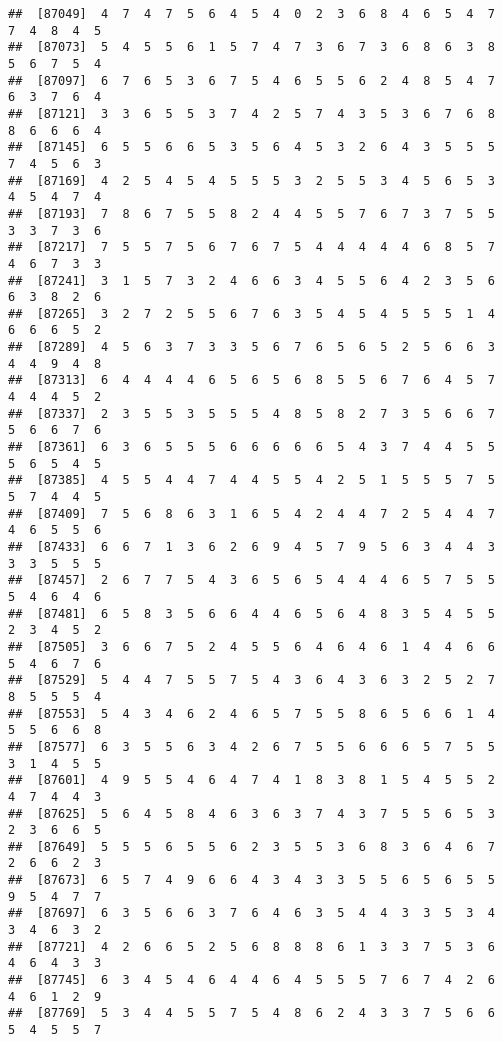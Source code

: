 \documentclass[
]{book}
\begin{document}
\begin{verbatim}
##  [87049]  4  7  4  7  5  6  4  5  4  0  2  3  6  8  4  6  5  4  7  7  4  8  4  5
##  [87073]  5  4  5  5  6  1  5  7  4  7  3  6  7  3  6  8  6  3  8  5  6  7  5  4
##  [87097]  6  7  6  5  3  6  7  5  4  6  5  5  6  2  4  8  5  4  7  6  3  7  6  4
##  [87121]  3  3  6  5  5  3  7  4  2  5  7  4  3  5  3  6  7  6  8  8  6  6  6  4
##  [87145]  6  5  5  6  6  5  3  5  6  4  5  3  2  6  4  3  5  5  5  7  4  5  6  3
##  [87169]  4  2  5  4  5  4  5  5  5  3  2  5  5  3  4  5  6  5  3  4  5  4  7  4
##  [87193]  7  8  6  7  5  5  8  2  4  4  5  5  7  6  7  3  7  5  5  3  3  7  3  6
##  [87217]  7  5  5  7  5  6  7  6  7  5  4  4  4  4  4  6  8  5  7  4  6  7  3  3
##  [87241]  3  1  5  7  3  2  4  6  6  3  4  5  5  6  4  2  3  5  6  6  3  8  2  6
##  [87265]  3  2  7  2  5  5  6  7  6  3  5  4  5  4  5  5  5  1  4  6  6  6  5  2
##  [87289]  4  5  6  3  7  3  3  5  6  7  6  5  6  5  2  5  6  6  3  4  4  9  4  8
##  [87313]  6  4  4  4  4  6  5  6  5  6  8  5  5  6  7  6  4  5  7  4  4  4  5  2
##  [87337]  2  3  5  5  3  5  5  5  4  8  5  8  2  7  3  5  6  6  7  5  6  6  7  6
##  [87361]  6  3  6  5  5  5  6  6  6  6  6  5  4  3  7  4  4  5  5  5  6  5  4  5
##  [87385]  4  5  5  4  4  7  4  4  5  5  4  2  5  1  5  5  5  7  5  5  7  4  4  5
##  [87409]  7  5  6  8  6  3  1  6  5  4  2  4  4  7  2  5  4  4  7  4  6  5  5  6
##  [87433]  6  6  7  1  3  6  2  6  9  4  5  7  9  5  6  3  4  4  3  3  3  5  5  5
##  [87457]  2  6  7  7  5  4  3  6  5  6  5  4  4  4  6  5  7  5  5  5  4  6  4  6
##  [87481]  6  5  8  3  5  6  6  4  4  6  5  6  4  8  3  5  4  5  5  2  3  4  5  2
##  [87505]  3  6  6  7  5  2  4  5  5  6  4  6  4  6  1  4  4  6  6  5  4  6  7  6
##  [87529]  5  4  4  7  5  5  7  5  4  3  6  4  3  6  3  2  5  2  7  8  5  5  5  4
##  [87553]  5  4  3  4  6  2  4  6  5  7  5  5  8  6  5  6  6  1  4  5  5  6  6  8
##  [87577]  6  3  5  5  6  3  4  2  6  7  5  5  6  6  6  5  7  5  5  3  1  4  5  5
##  [87601]  4  9  5  5  4  6  4  7  4  1  8  3  8  1  5  4  5  5  2  4  7  4  4  3
##  [87625]  5  6  4  5  8  4  6  3  6  3  7  4  3  7  5  5  6  5  3  2  3  6  6  5
##  [87649]  5  5  5  6  5  5  6  2  3  5  5  3  6  8  3  6  4  6  7  2  6  6  2  3
##  [87673]  6  5  7  4  9  6  6  4  3  4  3  3  5  5  6  5  6  5  5  9  5  4  7  7
##  [87697]  6  3  5  6  6  3  7  6  4  6  3  5  4  4  3  3  5  3  4  3  4  6  3  2
##  [87721]  4  2  6  6  5  2  5  6  8  8  8  6  1  3  3  7  5  3  6  4  6  4  3  3
##  [87745]  6  3  4  5  4  6  4  4  6  4  5  5  5  7  6  7  4  2  6  4  6  1  2  9
##  [87769]  5  3  4  4  5  5  7  5  4  8  6  2  4  3  3  7  5  6  6  5  4  5  5  7

\end{verbatim}
\end{document}
